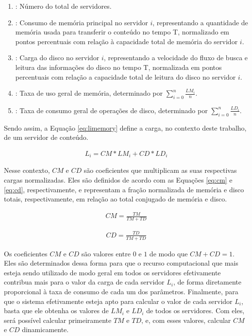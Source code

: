 \begin{enumerate}
    \item[$n$]: Número do total de servidores.
    \item[$LM_i$]: Consumo de memória principal no servidor $i$, representando a quantidade de memória usada para transferir o conteúdo no tempo T, normalizado em pontos percentuais com relação à capacidade total de memória do servidor $i$.
    \item[$LD_i$]: Carga do disco no servidor $i$, representando a velocidade do fluxo de busca e leitura das informações do disco no tempo T, normalizada em pontos percentuais com relação a capacidade total de leitura do disco no servidor $i$.
    \item[$TM$]: Taxa de uso geral de memória, determinado por $\sum_{i=0}^n \frac{LM_i}{n}$.
    \item[$TD$]: Taxa de consumo geral de operações de disco, determinado por $\sum_{i=0}^n \frac{LD_i}{n}$. 
\end{enumerate}

Sendo assim, a Equação \mbox{\ref{eq:limemory}} define a carga, no contexto deste trabalho, de um servidor de conteúdo.

\begin{gather} \label{eq:limemory}
    L_i = CM * LM_i + CD * LD_i
\end{gather}

Nesse contexto, $CM$ e $CD$ são coeficientes que multiplicam as suas respectivas cargas normalizadas. Eles são definidos de acordo com as Equações \mbox{\ref{eq:cm}} e \mbox{\ref{eq:cd}}, respectivamente, e representam a fração normalizada de memória e disco totais, respectivamente, em relação ao total conjugado de memória e disco.

\begin{gather} \label{eq:cm}
    CM = \frac{TM}{TM + TD}
\end{gather}

\begin{gather} \label{eq:cd}
    CD = \frac{TD}{TM + TD}
\end{gather}

Os coeficientes $CM$ e $CD$ são valores entre $0$ e $1$ de modo que $CM + CD = 1$. Eles são determinados dessa forma para que o recurso computacional que mais esteja sendo utilizado de modo geral em todos os servidores efetivamente contribua mais para o valor da carga de cada servidor $L_i$, de forma diretamente proporcional à taxa de consumo de cada um dos parâmetros. Finalmente, para que o sistema efetivamente esteja apto para calcular o valor de cada servidor $L_i$, basta que ele obtenha os valores de $LM_i$ e $LD_i$ de todos os servidores. Com eles, será possível calcular primeiramente $TM$ e $TD$, e, com esses valores, calcular $CM$ e $CD$ dinamicamente.

